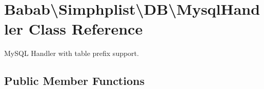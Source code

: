 \hypertarget{classBabab_1_1Simphplist_1_1DB_1_1MysqlHandler}{\section{Babab\textbackslash{}Simphplist\textbackslash{}D\+B\textbackslash{}Mysql\+Handler Class Reference}
\label{classBabab_1_1Simphplist_1_1DB_1_1MysqlHandler}
}


My\+S\+Q\+L Handler with table prefix support.  


\subsection*{Public Member Functions}
